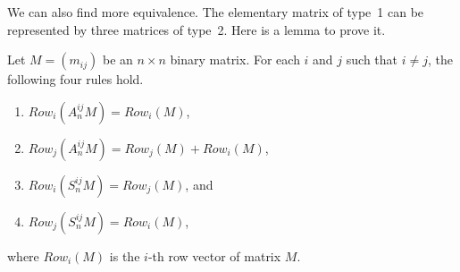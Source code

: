 We can also find more equivalence.
The elementary matrix of type~1 can be represented by three matrices of type~2.
Here is a lemma to prove it.

\begin{lemma} \label{lem:row}
Let $ M = (m_{ij}) $ be an $ n \times n $ binary matrix. For each $ i $ and $ j $ such that $ i \neq j $, the following four rules hold.
   \begin{enumerate}
   \item $ Row_i(A_n^{ij} M) = Row_i(M)$,
   \item $ Row_j(A_n^{ij} M) = Row_j(M) + Row_i(M) $,
   \item $ Row_i(S_n^{ij} M) = Row_j(M) $, and
   \item $ Row_j(S_n^{ij} M) = Row_i(M) $,
   \end{enumerate}
   where $ Row_i(M) $ is the $ i $-th row vector of matrix $ M $.
\end{lemma}

